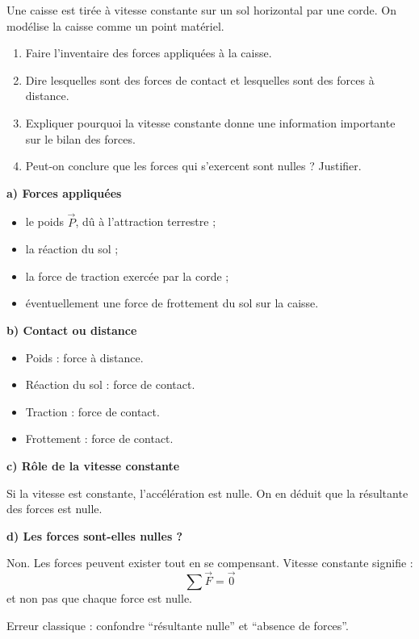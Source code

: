 \documentclass[11pt,a4paper]{article}
\begin{document}
\begin{enoncebox}
Une caisse est tirée à vitesse constante sur un sol horizontal par une corde.  
On modélise la caisse comme un point matériel.

\begin{enumerate}[label=\arabic*)]
    \item Faire l'inventaire des forces appliquées à la caisse.
    \item Dire lesquelles sont des forces de contact et lesquelles sont des forces à distance.
    \item Expliquer pourquoi la vitesse constante donne une information importante sur le bilan des forces.
    \item Peut-on conclure que les forces qui s'exercent sont nulles ? Justifier.
\end{enumerate}
\end{enoncebox}

\begin{corrigebox}
\textbf{a) Forces appliquées}

\begin{itemize}
    \item le poids \(\vec{P}\), dû à l'attraction terrestre ;
    \item la réaction du sol ;
    \item la force de traction exercée par la corde ;
    \item éventuellement une force de frottement du sol sur la caisse.
\end{itemize}

\textbf{b) Contact ou distance}

\begin{itemize}
    \item Poids : force à distance.
    \item Réaction du sol : force de contact.
    \item Traction : force de contact.
    \item Frottement : force de contact.
\end{itemize}

\textbf{c) Rôle de la vitesse constante}

Si la vitesse est constante, l'accélération est nulle.  
On en déduit que la résultante des forces est nulle.

\textbf{d) Les forces sont-elles nulles ?}

Non.  
Les forces peuvent exister tout en se compensant.  
Vitesse constante signifie :
\[
\sum \vec{F} = \vec{0}
\]
et non pas que chaque force est nulle.

\begin{attentionbox}
Erreur classique : confondre ``résultante nulle'' et ``absence de forces''.
\end{attentionbox}
\end{corrigebox}
\end{document}
